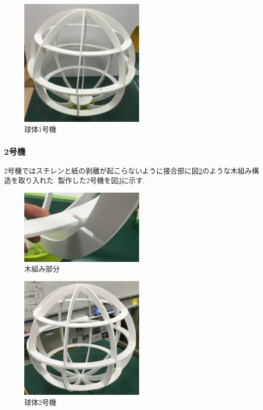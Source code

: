 \documentclass[12pt,oneside]{sotsuken_paper}
\begin{document}
\begin{figure}[htbp]
	\begin{center}
		\includegraphics[width=60mm]{image/sphere/sphere-1.jpg}
		\caption{球体1号機}
		\label{fig:sphere-1}
	\end{center}
\end{figure}

\subsubsection{2号機}
2号機ではスチレンと紙の剥離が起こらないように接合部に図\ref{fig:kigumi}のような木組み構造を取り入れた.
製作した2号機を図\ref{fig:sphere-2}に示す.

\begin{figure}[htbp]
	\begin{center}
		\includegraphics[width=60mm]{image/sphere/kigumi.jpg}
		\caption{木組み部分}
		\label{fig:kigumi}
	\end{center}
\end{figure}

\begin{figure}[htbp]
	\begin{center}
		\includegraphics[width=60mm]{image/sphere/sphere-2.jpg}
		\caption{球体2号機}
		\label{fig:sphere-2}
	\end{center}
\end{figure}
\end{document}
